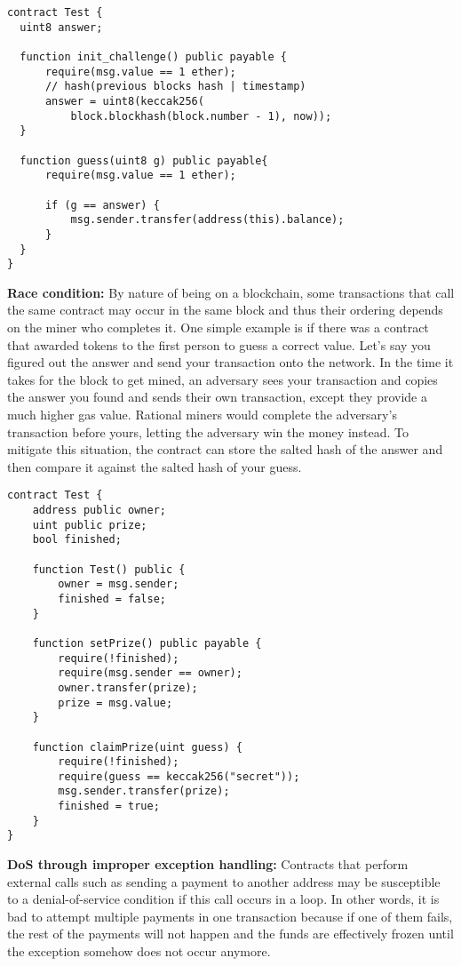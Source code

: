 \begin{lstlisting}[basicstyle=\small]
contract Test {
  uint8 answer;

  function init_challenge() public payable {
      require(msg.value == 1 ether);
      // hash(previous blocks hash | timestamp)
      answer = uint8(keccak256(
          block.blockhash(block.number - 1), now));
  }

  function guess(uint8 g) public payable{
      require(msg.value == 1 ether);
      
      if (g == answer) {
          msg.sender.transfer(address(this).balance);
      }
  }
}
\end{lstlisting}
\textbf{Race condition:} By nature of being on a blockchain, some transactions that call the same contract may occur in the same block and thus their ordering depends on the miner who completes it.
One simple example is if there was a contract that awarded tokens to the first person to guess a correct value.
Let's say you figured out the answer and send your transaction onto the network.
In the time it takes for the block to get mined, an adversary sees your transaction and copies the answer you found and sends their own transaction, except they provide a much higher gas value.
Rational miners would complete the adversary's transaction before yours, letting the adversary win the money instead.
To mitigate this situation, the contract can store the salted hash of the answer and then compare it against the salted hash of your guess.
\begin{lstlisting}[basicstyle=\small]
contract Test {
    address public owner;
    uint public prize;
    bool finished;

    function Test() public {
        owner = msg.sender;
        finished = false;
    }

    function setPrize() public payable {
        require(!finished);
        require(msg.sender == owner);
        owner.transfer(prize);
        prize = msg.value;
    }

    function claimPrize(uint guess) {
        require(!finished);
        require(guess == keccak256("secret"));
        msg.sender.transfer(prize);
        finished = true;
    }
}
\end{lstlisting}
\textbf{DoS through improper exception handling:} Contracts that perform external calls such as sending a payment to another address may be susceptible to a denial-of-service condition if this call occurs in a loop.
In other words, it is bad to attempt multiple payments in one transaction because if one of them fails, the rest of the payments will not happen and the funds are effectively frozen until the exception somehow does not occur anymore.
